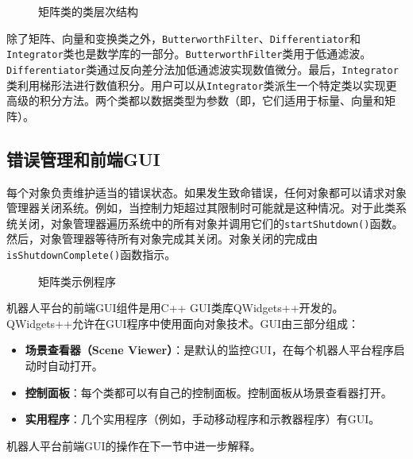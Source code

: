 \documentclass[UTF8,a4paper,12pt]{ctexart}
\begin{document}
\begin{figure}[htbp]
\centering
{}
\caption{矩阵类的类层次结构}
\label{fig:10.3.13}
\end{figure}

除了矩阵、向量和变换类之外，\texttt{ButterworthFilter}、\texttt{Differentiator}和\texttt{Integrator}类也是数学库的一部分。\texttt{ButterworthFilter}类用于低通滤波。\texttt{Differentiator}类通过反向差分法加低通滤波实现数值微分。最后，\texttt{Integrator}类利用梯形法进行数值积分。用户可以从\texttt{Integrator}类派生一个特定类以实现更高级的积分方法。两个类都以数据类型为参数（即，它们适用于标量、向量和矩阵）。

\subsection{错误管理和前端GUI}

每个对象负责维护适当的错误状态。如果发生致命错误，任何对象都可以请求对象管理器关闭系统。例如，当控制力矩超过其限制时可能就是这种情况。对于此类系统关闭，对象管理器遍历系统中的所有对象并调用它们的\texttt{startShutdown()}函数。然后，对象管理器等待所有对象完成其关闭。对象关闭的完成由\texttt{isShutdownComplete()}函数指示。

\begin{figure}[htbp]
\centering
{}
\caption{矩阵类示例程序}
\label{fig:10.4.1}
\end{figure}

机器人平台的前端GUI组件是用C++ GUI类库QWidgets++开发的。QWidgets++允许在GUI程序中使用面向对象技术。GUI由三部分组成：

\begin{itemize}
    \item \textbf{场景查看器（Scene Viewer）}：是默认的监控GUI，在每个机器人平台程序启动时自动打开。
    \item \textbf{控制面板}：每个类都可以有自己的控制面板。控制面板从场景查看器打开。
    \item \textbf{实用程序}：几个实用程序（例如，手动移动程序和示教器程序）有GUI。
\end{itemize}

机器人平台前端GUI的操作在下一节中进一步解释。
\end{document}
